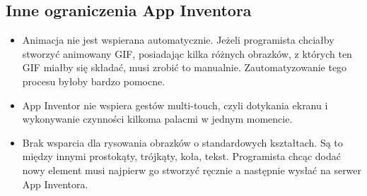 \subsection{Inne ograniczenia App Inventora}

\begin{itemize}
\item Animacja nie jest wspierana automatycznie. Jeżeli programista chciałby stworzyć animowany GIF, posiadając kilka różnych obrazków, z których ten GIF miałby się składać, musi zrobić to manualnie. Zautomatyzowanie tego procesu byłoby bardzo pomocne.
\item App Inventor nie wspiera gestów multi-touch, czyli dotykania ekranu i wykonywanie czynności kilkoma palacmi w jednym momencie.
\item Brak wsparcia dla rysowania obrazków o standardowych kształtach. Są to między innymi prostokąty, trójkąty, koła, tekst. Programista chcąc dodać nowy element musi najpierw go stworzyć ręcznie a następnie wysłać na serwer App Inventora.
\end{itemize}
